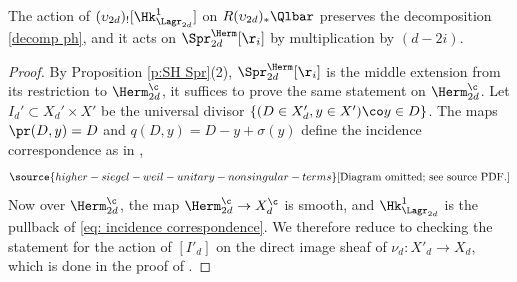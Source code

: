 \begin{prop}
\notready\label{p:action Hk1} The action of $(\upsilon_{2d})_{!}[\Hk^{1}_{\Lagr_{2d}}]$ on $R(\upsilon_{2d})_{*}\Qlbar$ preserves the decomposition \eqref{decomp ph},  and it acts on $\Spr^{\Herm}_{2d}[\r_{i}]$ by multiplication by $(d-2i)$.
\end{prop}
\begin{proof}By Proposition \ref{p:SH Spr}(2),  $\Spr^{\Herm}_{2d}[\r_{i}]$ is the middle extension from its restriction to $\Herm^{\c}_{2d}$, it suffices to prove the same statement on $\Herm_{2d}^{\c}$. Let $I_d' \subset X_d' \times X'$ be the universal divisor $\{(D \in X_d', y \in X') \co y \in D\}$. The maps $\pr(D,y) = D$ and $q(D,y) = D-y+\sigma(y)$ define the incidence correspondence as in \cite[proof of Proposition 8.3]{YZ},
\begin{equation}\label{eq: incidence correspondence}
\source{higher-siegel-weil-unitary-nonsingular-terms}
\text{[Diagram omitted; see source PDF.]}
\end{equation}
Now over $\Herm_{2d}^{\c}$, the map $\Herm_{2d}^{\c}\to X^{\c}_{d}$ is smooth, and $\Hk^{1}_{\Lagr_{2d}}$ is the pullback of \eqref{eq: incidence correspondence}. We therefore reduce to checking the statement for the action of $[I'_{d}]$ on the direct image sheaf of $\nu_{d}: X'_{d}\to X_{d}$, which is done in the proof of \cite[Proposition 8.3]{YZ}.
\end{proof}

